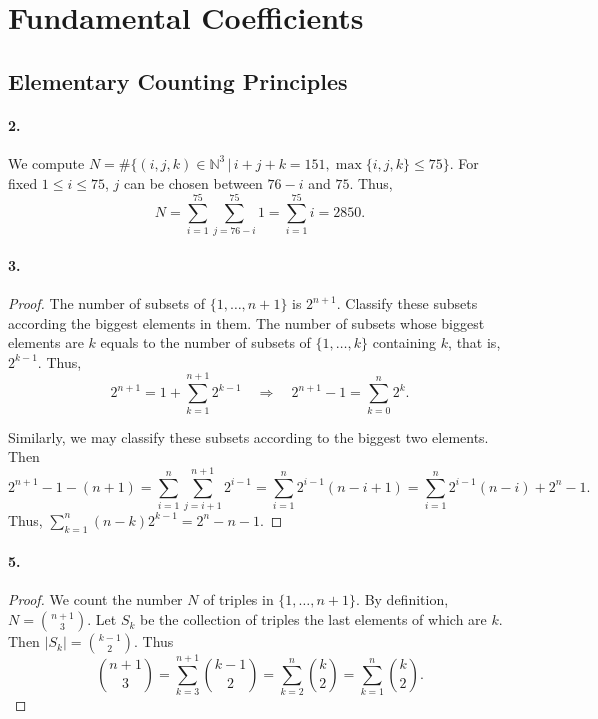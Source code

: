 \section{Fundamental Coefficients}
\subsection{Elementary Counting Principles}
  \paragraph{2.}
  \begin{solution}
    We compute $N=\#\{(i,j,k)\in\mathbb{N}^3\,|\,i+j+k=151,\max\{i,j,k\}\le 
    75\}$. For fixed $1\le i\le 75$, $j$ can be chosen between $76-i$ and $75$.
    Thus,
    \[
      N=\sum_{i=1}^{75}\sum_{j=76-i}^{75}1=\sum_{i=1}^{75}i=2850.
    \]
  \end{solution}
  
  \paragraph{3.}
  \begin{proof}
    The number of subsets of $\{1,\dots,n+1\}$ is $2^{n+1}$. Classify these 
    subsets according the biggest elements in them. The number of subsets whose
    biggest elements are $k$ equals to the number of subsets of $\{1,\dots,k\}$
    containing $k$, that is, $2^{k-1}$. Thus,
    \[
      2^{n+1}=1+\sum_{k=1}^{n+1}2^{k-1}
      \quad\Rightarrow\quad
      2^{n+1}-1=\sum_{k=0}^n 2^k.
    \]\par
    Similarly, we may classify these subsets according to the biggest two 
    elements. Then
    \[
      2^{n+1}-1-(n+1)=\sum_{i=1}^n\sum_{j=i+1}^{n+1}2^{i-1}=
      \sum_{i=1}^n2^{i-1}(n-i+1)=\sum_{i=1}^n2^{i-1}(n-i)+2^n-1.
    \]
    Thus, $\sum_{k=1}^n(n-k)2^{k-1}=2^n-n-1$.
  \end{proof}

  \paragraph{5.}
  \begin{proof}
    We count the number $N$ of triples in $\{1,\dots,n+1\}$. By definition, 
    $N=\binom{n+1}{3}$. Let $S_k$ be the collection of triples the last
    elements of which are $k$. Then $|S_k|=\binom{k-1}{2}$. Thus
    \[
      \binom{n+1}{3}=\sum_{k=3}^{n+1}\binom{k-1}{2}=\sum_{k=2}^n\binom{k}{2}
      =\sum_{k=1}^n\binom{k}{2}.
    \]
  \end{proof}
  
